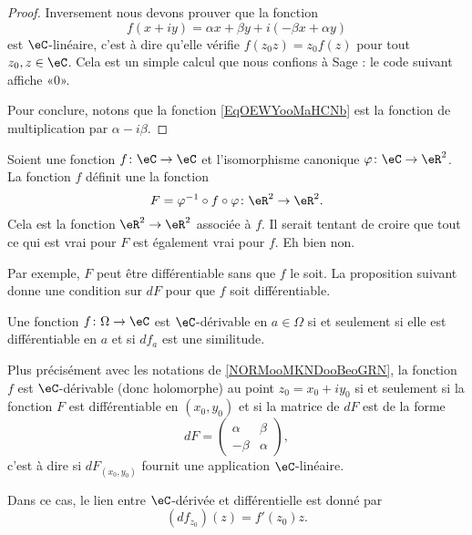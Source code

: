 \begin{proof}
    Inversement nous devons prouver que la fonction 
    \begin{equation}        \label{EqOEWYooMaHCNb}
        f(x+iy)=\alpha x+\beta y+i(-\beta x+\alpha y)
    \end{equation}
    est \( \eC\)-linéaire, c'est à dire qu'elle vérifie \( f(z_0z)=z_0f(z)\) pour tout \( z_0,z\in \eC\). Cela est un simple calcul que nous confions à Sage : le code suivant affiche «\( 0\)».
    

    Pour conclure, notons que la fonction \eqref{EqOEWYooMaHCNb} est la fonction de multiplication par \( \alpha-i\beta\).
\end{proof}

\begin{normaltext}      \label{NORMooMKNDooBeoGRN}
    Soient une fonction \( f\colon \eC\to \eC\) et l'isomorphisme canonique \( \varphi\colon \eC\to \eR^2\). La fonction \( f\) définit une la fonction
    \begin{equation}
        F=\varphi^{-1} \circ f\circ \varphi\colon \eR^2\to \eR^2.
    \end{equation}
    Cela est la fonction \( \eR^2\to \eR^2\) associée à \( f\). Il serait tentant de croire que tout ce qui est vrai pour \( F\) est également vrai pour \( f\). Eh bien non.

    Par exemple, \( F\) peut être différentiable sans que \( f\) le soit. La proposition suivant donne une condition sur \( dF\) pour que \( f\) soit différentiable.
\end{normaltext}

\begin{proposition}     \label{PropKJUDooJfqgYS}
    Une fonction \( f\colon \Omega\to \eC\) est $\eC$-dérivable en \( a\in\Omega\) si et seulement si elle est différentiable en \( a\) et si \( df_a\) est une similitude.

    Plus précisément avec les notations de \ref{NORMooMKNDooBeoGRN}, la fonction \( f\) est $\eC$-dérivable (donc holomorphe) au point \( z_0=x_0+iy_0\) si et seulement si la fonction \( F\) est différentiable en \( (x_0,y_0)\) et si la matrice de \( dF\) est de la forme
    \begin{equation}        \label{EQooWZGKooLDEHGr}
        dF=\begin{pmatrix}
            \alpha    &   \beta    \\ 
            -\beta    &   \alpha    
        \end{pmatrix},
    \end{equation}
    c'est à dire si \( dF_{(x_0,y_0)}\) fournit une application \( \eC\)-linéaire.

    Dans ce cas, le lien entre \( \eC\)-dérivée et différentielle est donné par
    \begin{equation}        \label{EqPAEFooYNhYpz}
        (df_{z_0})(z)=f'(z_0)z.
    \end{equation}
\end{proposition}

